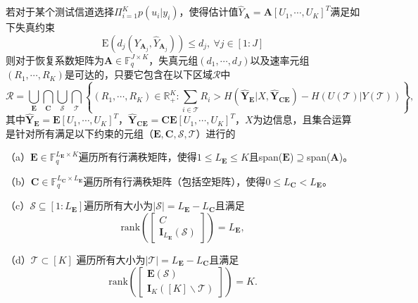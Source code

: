 \begin{theorem}\label{<theorem-chapter-2>}
	若对于某个测试信道选择$\Pi_{i=1}^Kp(u_i|y_i)$，使得估计值$\hat{Y}_{\mathbf{A}}=\mathbf{A}[U_1,\cdots,U_K]^T$满足如下失真约束
	\begin{equation}
		\text{E}\left(d_j(Y_{\mathbf{A}_j}, \hat{Y}_{\mathbf{A}_j})\right)\leq d_j,~\forall j\in[1:J]
	\end{equation}
	则对于恢复系数矩阵为$\mathbf{A}\in \mathbb{F}_q^{J\times K}$，失真元组$(d_1,\cdots,d_J)$以及速率元组$(R_1,\cdots,R_K)$是可达的，只要它包含在以下区域$\mathcal{R}$中
	\begin{equation}
		\mathcal{R}=\bigcup_{\mathbf{E}}\bigcap_{\mathbf{C}}\bigcup_{\mathcal{S}}\bigcap_{\mathcal{T}}\left\{(R_1,\cdots,R_K)\in \mathbb{R}_+^K: \sum_{i\in\mathcal{T}}R_i>H(\hat{\mathbf{Y}}_\mathbf{E}|X,\hat{\mathbf{Y}}_{\mathbf{C}\mathbf{E}})-H(U(\mathcal{T})|Y(\mathcal{T}))\right\},
	\end{equation}
	其中$\hat{\mathbf{Y}}_{\mathbf{E}}=\mathbf{E}[U_1,\cdots,U_K]^T$，$\hat{\mathbf{Y}}_{\mathbf{C}\mathbf{E}}=\mathbf{C}\mathbf{E}[U_1,\cdots,U_K]^T$，$X$为边信息，且集合运算是针对所有满足以下约束的元组（$\mathbf{E},\mathbf{C},\mathcal{S},\mathcal{T}$）进行的
	
	（a）$\mathbf{E}\in \mathbb{F}_q^{L_{\mathbf{E}}\times K}$遍历所有行满秩矩阵，使得$1\leq L_{\mathbf{E}}\leq K$且span($\mathbf{E}$)$\supseteq$span($\mathbf{A}$)。
	
	（b）$\mathbf{C}\in \mathbb{F}_q^{L_{\mathbf{C}}\times L_{\mathbf{E}}}$遍历所有行满秩矩阵（包括空矩阵），使得$0\leq L_{\mathbf{C}}< L_{\mathbf{E}}$。
	
	（c）$\mathcal{S}\subseteq[1:L_{\mathbf{E}}]$遍历所有大小为$|\mathcal{S}|=L_{\mathbf{E}}-L_{\mathbf{C}}$且满足
	\begin{equation}
		\textrm{rank}\left(\left[\begin{matrix}
			C\\
			\mathbf{I}_{L_{\mathbf{E}}}(\mathcal{S})
		\end{matrix}\right]\right)=L_{\mathbf{E}},
	\end{equation}
	
	（d）$\mathcal{T}\subset[K]$ 遍历所有大小为$|\mathcal{T}|=L_{\mathbf{E}}-L_{\mathbf{C}}$且满足
	\begin{equation}
		\textrm{rank}\left(\left[\begin{matrix}
			\mathbf{E}(\mathcal{S})\\
			\mathbf{I}_K([K] \backslash \mathcal{T})
		\end{matrix}\right]\right)=K.
	\end{equation}
	
\end{theorem}


